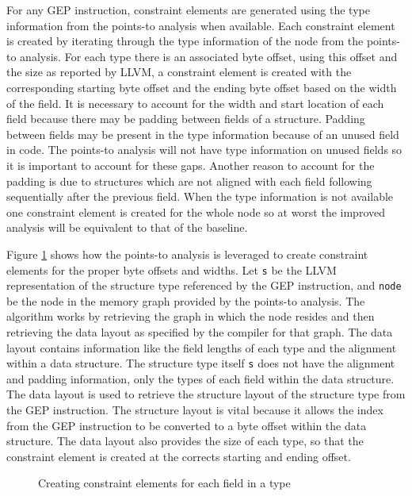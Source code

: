 For any GEP instruction, constraint elements are generated using the type
information from the points-to analysis when available. Each constraint element
is created by iterating through the type information of the node from the
points-to analysis. For each type there is an associated byte offset, using this
offset and the size as reported by LLVM, a constraint element is created with
the corresponding starting byte offset and the ending byte offset based on the
width of the field. It is necessary to account for the width and start location
of each field because there may be padding between fields of a structure.
Padding between fields may be present in the type information because of an
unused field in code. The points-to analysis will not have type information on
unused fields so it is important to account for these gaps. Another reason to
account for the padding is due to structures which are not aligned with each
field following sequentially after the previous field. When the type information
is not available one constraint element is created for the whole node so at
worst the improved analysis will be equivalent to that of the baseline.

Figure \ref{alg:generateconselem} shows how the points-to analysis is
leveraged to create constraint elements for the proper byte offsets and widths.
Let \texttt{s} be the LLVM representation of the structure type referenced by
the GEP instruction, and \texttt{node} be the node in the memory graph provided
by the points-to analysis. The algorithm works by retrieving the graph in which
the node resides and then retrieving the data layout as specified by the
compiler for that graph. The data layout contains information like the field
lengths of each type and the alignment within a data structure. The structure
type itself \texttt{s} does not have the alignment and padding information, only
the types of each field within the data structure. The data layout is used to
retrieve the structure layout of the structure type from the GEP instruction.
The structure layout is vital because it allows the index from the GEP
instruction to be converted to a byte offset within the data structure. The
data layout also provides the size of each type, so that the constraint element
is created at the corrects starting and ending offset.


\begin{figure}[h!]
  
  \caption{Creating constraint elements for each field in a type}
  \label{alg:generateconselem}
\end{figure}

